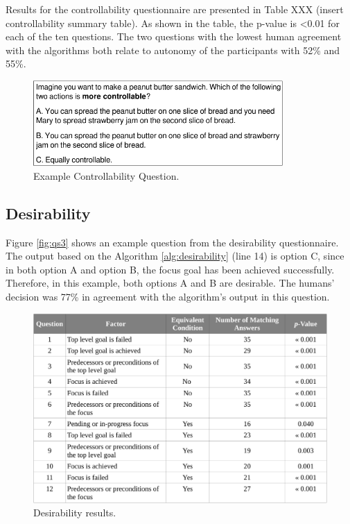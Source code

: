 \documentclass[12pt]{report}
\begin{document}
Results for the controllability questionnaire are presented in Table XXX
(insert controllability summary table). As shown in the table, the p-value is
<0.01 for each of the ten questions. The two questions with the lowest human
agreement with the algorithms both relate to autonomy of the participants with
52\% and 55\%. 

\begin{figure}[tbh]
  \centering
  \includegraphics[width=0.85\textwidth]{figure/question-sample2-croped.pdf}
  \caption{{\fontsize{9}{9}\selectfont Example Controllability Question.}}
  \label{fig:qs2}
\end{figure}

\subsection{Desirability}
\label{sec:desirability-crowdsourcing}
Figure \ref{fig:qs3} shows an example question from the desirability
questionnaire. The output based on the Algorithm \ref{alg:desirability}
(line 14) is option C, since in both option A and option B, the focus goal
has been achieved successfully. Therefore, in this example, both options A and B
are desirable. The humans' decision was 77\% in agreement with the algorithm's
output in this question.

\begin{figure}[tbh]
  \centering
  \includegraphics[width=1\textwidth]{figure/desirability_result_croped.pdf}
  \caption{Desirability results.}
  \label{fig:desirability_result}
\end{figure}
\end{document}
